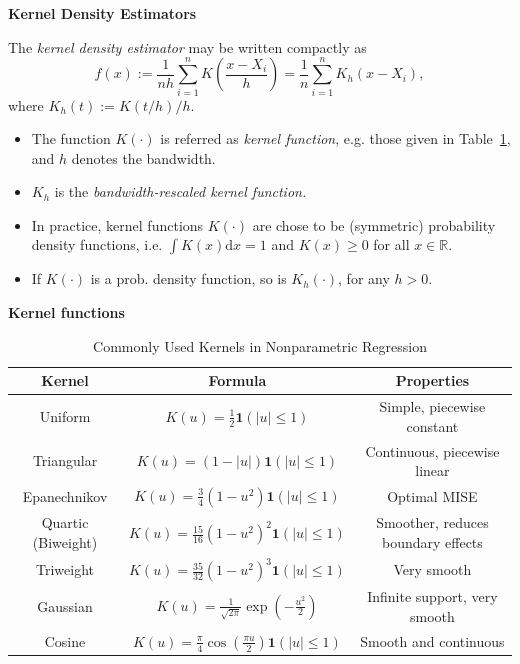 \documentclass[19pt,landscape]{article}
\newcommand{\R}{\mathbb{R}}
\begin{document}
    \newpage
    {\LARGE\centerline{\textbf{Kernel Density Estimators}}}
    \vskip25pt
    \begin{minipage}{.9\textwidth}
        \Large 
       The {\it kernel density estimator} may be written compactly as 
       \begin{equation}\label{def-kde}
        \hat{f}(x):=\frac1{nh}\sum_{i=1}^nK\left(\frac{x-X_i}h\right)=\frac1n\sum_{i=1}^nK_h(x-X_i),
       \end{equation}
        where $K_h(t):=K(t/h)/h$. 
        \vskip5pt
        \begin{itemize}
            \item The function $K(\cdot)$ is referred as {\it kernel function}, e.g. those given in Table~\ref{tabkernels}, and $h$ denotes the bandwidth.
            \item $K_h$ is the {\it bandwidth-rescaled kernel function.}
            \item In practice, kernel functions $K(\cdot)$ are chose to be (symmetric) probability density functions, i.e. $\int K(x)\mathrm{d}x=1$ and $K(x)\ge0$ for all $x\in\R$.
            \item If $K(\cdot)$ is a prob. density function, so is $K_h(\cdot)$, for any $h>0$.
        \end{itemize}
        \end{minipage}

\newpage
{\LARGE\centerline{\textbf{Kernel functions}}}
\vskip25pt
\begin{table}[h!]
    \centering
    \renewcommand{\arraystretch}{2} %
    \begin{tabular}{|c|c|c|}
        \hline
        \textbf{Kernel} & \textbf{Formula} & \textbf{Properties} \\
        \hline
        Uniform & \( K(u) = \frac{1}{2} \mathbf{1}(|u| \leq 1) \) & Simple, piecewise constant \\
        \hline
        Triangular & \( K(u) = (1 - |u|) \mathbf{1}(|u| \leq 1) \) & Continuous, piecewise linear \\
        \hline
        Epanechnikov & \( K(u) = \frac{3}{4} (1 - u^2) \mathbf{1}(|u| \leq 1) \) & Optimal MISE \\
        \hline
        Quartic (Biweight) & \( K(u) = \frac{15}{16} (1 - u^2)^2 \mathbf{1}(|u| \leq 1) \) & Smoother, reduces boundary effects \\
        \hline
        Triweight & \( K(u) = \frac{35}{32} (1 - u^2)^3 \mathbf{1}(|u| \leq 1) \) & Very smooth \\
        \hline
        Gaussian & \( K(u) = \frac{1}{\sqrt{2\pi}} \exp\left(-\frac{u^2}{2}\right) \) & Infinite support, very smooth \\
        \hline
        Cosine & \( K(u) = \frac{\pi}{4} \cos\left(\frac{\pi u}{2}\right) \mathbf{1}(|u| \leq 1) \) & Smooth and continuous \\
        \hline
    \end{tabular}
    \caption{Commonly Used Kernels in Nonparametric Regression}
    \label{tabkernels}
\end{table}
\end{document}
